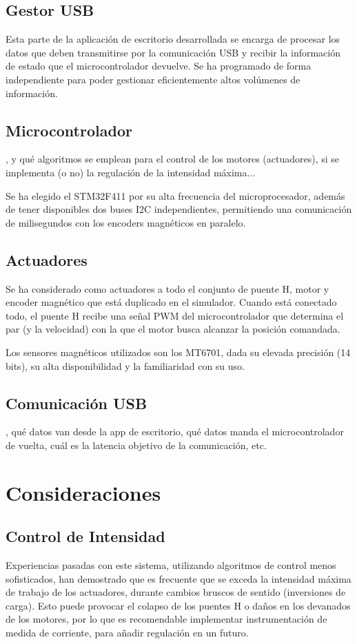 \documentclass[10pt, oneside]{trabajo}
\begin{document}
\subsection{Gestor USB}
Esta parte de la aplicación de escritorio desarrollada se encarga de procesar los datos que deben transmitirse por la comunicación USB y recibir la información de estado que el microcontrolador devuelve. Se ha programado de forma independiente para poder gestionar eficientemente altos volúmenes de información.

\subsection{Microcontrolador}
, y qué algoritmos se emplean para el control de los motores (actuadores), si se implementa (o no) la regulación de la intensidad máxima...
\par Se ha elegido el STM32F411 por su alta frecuencia del microprocesador, además de tener disponibles dos buses I2C independientes, permitiendo una comunicación de milisegundos con los encoders magnéticos en paralelo.

\subsection{Actuadores}
Se ha considerado como actuadores a todo el conjunto de puente H, motor y encoder magnético que está duplicado en el simulador. Cuando está conectado todo, el puente H recibe una señal PWM del microcontrolador que determina el par (y la velocidad) con la que el motor busca alcanzar la posición comandada.
\par Los sensores magnéticos utilizados son los MT6701, dada su elevada precisión (14 bits), su alta disponibilidad y la familiaridad con su uso.

\subsection{Comunicación USB}
, qué datos van desde la app de escritorio, qué datos manda el microcontrolador de vuelta, cuál es la latencia objetivo de la comunicación, etc.

\section{Consideraciones}
\subsection{Control de Intensidad}
Experiencias pasadas con este sistema, utilizando algoritmos de control menos sofisticados, han demostrado que es frecuente que se exceda la intensidad máxima de trabajo de los actuadores, durante cambios bruscos de sentido (inversiones de carga). Esto puede provocar el colapso de los puentes H o daños en los devanados de los motores, por lo que es recomendable implementar instrumentación de medida de corriente, para añadir regulación en un futuro.
\end{document}
